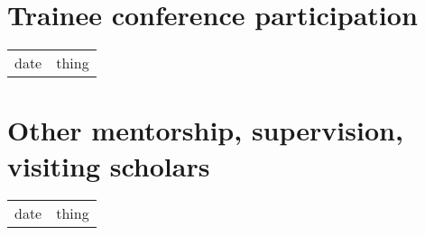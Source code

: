 \section{Trainee conference participation}

\begin{tabular}[l]{ p{} p{} }

date & thing\\

\end{tabular} 

\section{Other mentorship, supervision, visiting scholars}

\begin{tabular}[l]{ p{} p{} }

date & thing\\

\end{tabular} 